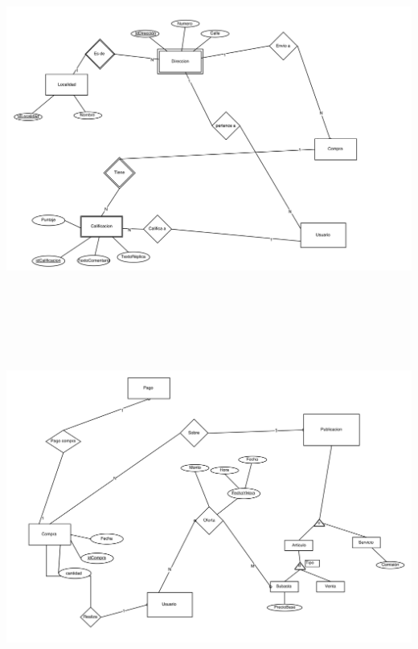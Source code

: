 \documentclass[a4paper, 10pt, twoside]{article}
\begin{document}
\includegraphics[width=20cm, height=12cm]{der1}
\includegraphics[width=18cm, height=12cm]{der2}
\end{document}

